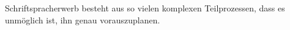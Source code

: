Schriftspracherwerb besteht aus so vielen komplexen Teilprozessen, dass es unmöglich ist, ihn genau vorauszuplanen.